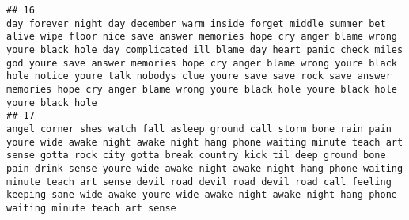 \documentclass[]{article}
\begin{document}
\begin{verbatim}
## 16                                                                                                                                                                                                                                                                                                                                                                                                                                                                                                                                                                                                                                                                                                                                                                                      day forever night day december warm inside forget middle summer bet alive wipe floor nice save answer memories hope cry anger blame wrong youre black hole day complicated ill blame day heart panic check miles god youre save answer memories hope cry anger blame wrong youre black hole notice youre talk nobodys clue youre save save rock save answer memories hope cry anger blame wrong youre black hole youre black hole youre black hole
## 17                                                                                                                                                                                                                                                                                                                                                                                                                                                                                                                                                                                                                                                                                                                                                                        angel corner shes watch fall asleep ground call storm bone rain pain youre wide awake night awake night hang phone waiting minute teach art sense gotta rock city gotta break country kick til deep ground bone pain drink sense youre wide awake night awake night hang phone waiting minute teach art sense devil road devil road devil road call feeling keeping sane wide awake youre wide awake night awake night hang phone waiting minute teach art sense

\end{verbatim}
\end{document}
